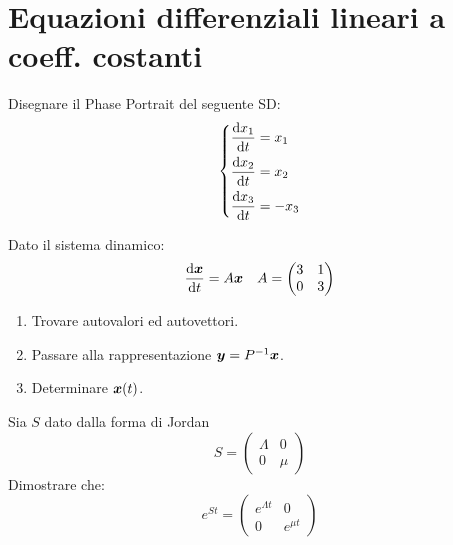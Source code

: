 \section{Equazioni differenziali lineari a coeff. costanti}%
\begin{ex}
    Disegnare il Phase Portrait del seguente SD:
    \[\begin{dcases}
        \frac{\text{d} x_1}{\text{d} t}  = x_1\\
	\frac{\text{d} x_2}{\text{d} t} = x_2\\
	\frac{\text{d} x_3}{\text{d} t} = - x_3
    \end{dcases}\] 
\end{ex}
\noindent
\begin{ex}
    Dato il sistema dinamico:
    \[
	\frac{\text{d} \boldsymbol{x}}{\text{d} t} = A \boldsymbol{x}  \quad A = \begin{pmatrix} 3 & 1 \\ 0 & 3 \end{pmatrix} 
    \] 
    \begin{enumerate}
        \item Trovare autovalori ed autovettori.
	\item Passare alla rappresentazione $\boldsymbol{y} = P^{-1}\boldsymbol{x}$.
	\item Determinare $\boldsymbol{x} (t)$.
    \end{enumerate}
\end{ex}
\noindent
\begin{ex}
    Sia $S$ dato dalla forma di Jordan 
    \[
	S = \begin{pmatrix} \Lambda  & 0 \\ 0 & \mu \end{pmatrix} 
    \] 
    Dimostrare che:
    \[
	e^{St}=\begin{pmatrix} e^{\Lambda t} & 0 \\ 0 & e^{\mu t} \end{pmatrix} 
    \] 
\end{ex}
\noindent
